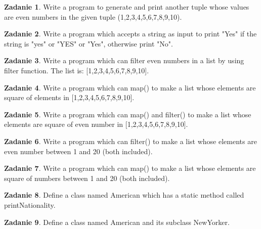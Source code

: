 \documentclass[11pt]{article}
\theoremstyle{definition}
\newtheorem{zadanie}{Zadanie}
\begin{document}
\begin{zadanie}
Write a program to generate and print another tuple whose values are even numbers in the given tuple (1,2,3,4,5,6,7,8,9,10).

\end{zadanie}

\begin{zadanie}
Write a program which accepts a string as input to print "Yes" if the string is "yes" or "YES" or "Yes", otherwise print "No".

\end{zadanie}

\begin{zadanie}
Write a program which can filter even numbers in a list by using filter function. The list is: [1,2,3,4,5,6,7,8,9,10].

\end{zadanie}

\begin{zadanie}
Write a program which can map() to make a list whose elements are square of elements in [1,2,3,4,5,6,7,8,9,10].

\end{zadanie}

\begin{zadanie}
Write a program which can map() and filter() to make a list whose elements are square of even number in [1,2,3,4,5,6,7,8,9,10].

\end{zadanie}

\begin{zadanie}
Write a program which can filter() to make a list whose elements are even number between 1 and 20 (both included).

\end{zadanie}

\begin{zadanie}
Write a program which can map() to make a list whose elements are square of numbers between 1 and 20 (both included).

\end{zadanie}

\begin{zadanie}
Define a class named American which has a static method called printNationality.

\end{zadanie}

\begin{zadanie}
Define a class named American and its subclass NewYorker.

\end{zadanie}
\end{document}
